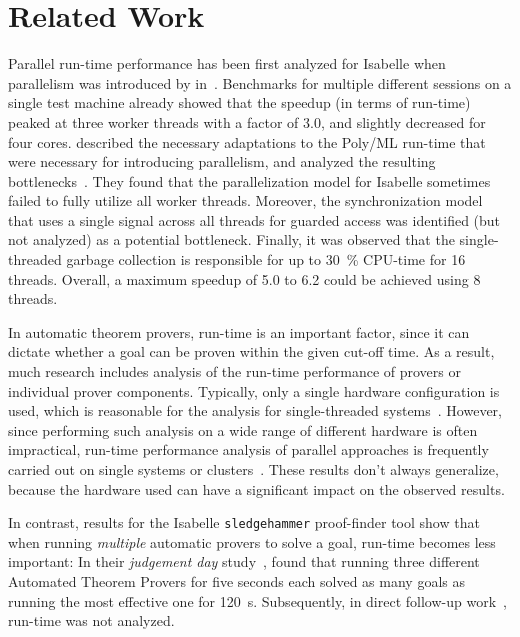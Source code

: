 
\section{Related Work}\label{sec:related}
Parallel run-time performance has been first analyzed for Isabelle
when parallelism was introduced by \citeauthor{Parallel2009Wenzel} in~\cite{Parallel2009Wenzel}.
Benchmarks for multiple different sessions on a single test machine already showed
that the speedup
(in terms of run-time)
peaked at three worker threads with a factor of \num{3.0},
and slightly decreased for four cores.
\citeauthor{PolyParallel2010Matthews} described the necessary adaptations to the Poly/ML run-time
that were necessary for introducing parallelism,
and analyzed the resulting bottlenecks~\cite{PolyParallel2010Matthews}.
They found that the parallelization model for Isabelle sometimes failed to fully utilize all worker threads.
Moreover, the synchronization model that uses a single signal across all threads for guarded access
was identified (but not analyzed) as a potential bottleneck.
Finally, it was observed that the single-threaded garbage collection is responsible for up to \SI{30}{\percent} CPU-time for \num{16} threads.
Overall, a maximum speedup of \num{5.0} to \num{6.2} could be achieved
using \num{8} threads.

In automatic theorem provers, run-time is an important factor,
since it can dictate whether a goal can be proven within the given cut-off time.
As a result, much research includes analysis of the run-time performance of provers
or individual prover components.
Typically, only a single hardware configuration is used,
which is reasonable for the analysis for single-threaded systems~\cite{PerformanceESat2016Schulz}.
However, since performing such analysis on a wide range of different hardware is often impractical,
run-time performance analysis of parallel approaches
is frequently carried out on single systems or clusters~\cite{PerformanceOR1991Ertel,ParallelDeduction1992Jindal,ParallelHyper2001Wu}.
These results don't always generalize, because the hardware used can have a significant impact on the observed results.

In contrast, results for the Isabelle \texttt{sledgehammer} proof-finder tool show that when running \emph{multiple} automatic provers to solve a goal,
run-time becomes less important:
In their \emph{judgement day} study~\cite{Judgementday2010Boehme},
\citeauthor{Judgementday2010Boehme} found that running three different Automated Theorem Provers for five seconds each
solved as many goals as running the most effective one for \SI{120}{\second}.
Subsequently, in direct follow-up work~\cite{SMTHammer2011Blanchette}, run-time was not analyzed.

